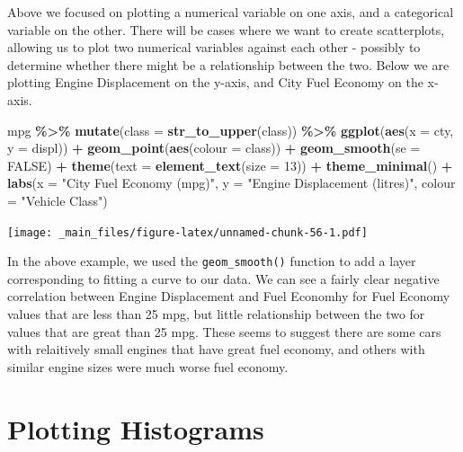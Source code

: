 \documentclass[
]{book}
\newenvironment{Shaded}{\begin{snugshade}}{\end{snugshade}}
\newcommand{\AttributeTok}[1]{\textcolor[rgb]{0.13,0.29,0.53}{#1}}
\newcommand{\ConstantTok}[1]{\textcolor[rgb]{0.56,0.35,0.01}{#1}}
\newcommand{\DecValTok}[1]{\textcolor[rgb]{0.00,0.00,0.81}{#1}}
\newcommand{\FunctionTok}[1]{\textcolor[rgb]{0.13,0.29,0.53}{\textbf{#1}}}
\newcommand{\NormalTok}[1]{#1}
\newcommand{\SpecialCharTok}[1]{\textcolor[rgb]{0.81,0.36,0.00}{\textbf{#1}}}
\newcommand{\StringTok}[1]{\textcolor[rgb]{0.31,0.60,0.02}{#1}}
\begin{document}
Above we focused on plotting a numerical variable on one axis, and a categorical variable on the other. There will be cases where we want to create scatterplots, allowing us to plot two numerical variables against each other - possibly to determine whether there might be a relationship between the two. Below we are plotting Engine Displacement on the y-axis, and City Fuel Economy on the x-axis.

\begin{Shaded}
\begin{Highlighting}[]
\NormalTok{mpg }\SpecialCharTok{\%\textgreater{}\%}
  \FunctionTok{mutate}\NormalTok{(}\AttributeTok{class =} \FunctionTok{str\_to\_upper}\NormalTok{(class)) }\SpecialCharTok{\%\textgreater{}\%}
  \FunctionTok{ggplot}\NormalTok{(}\FunctionTok{aes}\NormalTok{(}\AttributeTok{x =}\NormalTok{ cty, }\AttributeTok{y =}\NormalTok{ displ)) }\SpecialCharTok{+}
  \FunctionTok{geom\_point}\NormalTok{(}\FunctionTok{aes}\NormalTok{(}\AttributeTok{colour =}\NormalTok{ class)) }\SpecialCharTok{+}
  \FunctionTok{geom\_smooth}\NormalTok{(}\AttributeTok{se =} \ConstantTok{FALSE}\NormalTok{) }\SpecialCharTok{+}
  \FunctionTok{theme}\NormalTok{(}\AttributeTok{text =} \FunctionTok{element\_text}\NormalTok{(}\AttributeTok{size =} \DecValTok{13}\NormalTok{)) }\SpecialCharTok{+}
  \FunctionTok{theme\_minimal}\NormalTok{() }\SpecialCharTok{+} 
  \FunctionTok{labs}\NormalTok{(}\AttributeTok{x =} \StringTok{"City Fuel Economy (mpg)"}\NormalTok{,}
       \AttributeTok{y =} \StringTok{"Engine Displacement (litres)"}\NormalTok{, }
       \AttributeTok{colour =} \StringTok{"Vehicle Class"}\NormalTok{)}
\end{Highlighting}
\end{Shaded}

\texttt{[image: \_main\_files/figure-latex/unnamed-chunk-56-1.pdf]}

In the above example, we used the \texttt{geom\_smooth()} function to add a layer corresponding to fitting a curve to our data. We can see a fairly clear negative correlation between Engine Displacement and Fuel Economhy for Fuel Economy values that are less than 25 mpg, but little relationship between the two for values that are great than 25 mpg. These seems to suggest there are some cars with relaitively small engines that have great fuel economy, and others with similar engine sizes were much worse fuel economy.

\hypertarget{plotting-histograms}{%
\section{Plotting Histograms}\label{plotting-histograms}}
\end{document}
